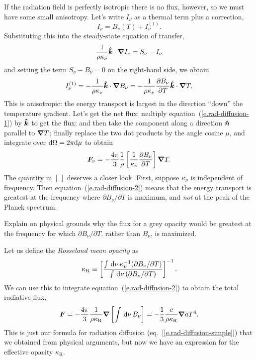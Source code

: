 If the radiation field is perfectly isotropic there is no flux, however, so we must have some small anisotropy. Let's write $I_{\nu}$ as a thermal term plus a correction, 
\[ I_{\nu} = B_{\nu}(T) + I^{(1)}_{\nu}. \]
Substituting this into the steady-state equation of transfer,
\[ \frac{1}{\rho\kappa_{\nu}}\bm{\hat{k}}\cdot\bm{\nabla} I_{\nu}  = S_{\nu} - I_{\nu}\]
and setting the term $S_{\nu}-B_{\nu}=0$ on the right-hand side, we obtain
\begin{equation}\label{e.rad-diffusion-1}
I_{\nu}^{(1)} = -\frac{1}{\rho\kappa_{\nu}} \bm{\hat{k}}\cdot\bm{\nabla} B_{\nu} = -\frac{1}{\rho\kappa_{\nu}} \frac{\partial B_{\nu}}{\partial T} \bm{\hat{k}}\cdot\bm{\nabla} T.
\end{equation}
This is anisotropic: the energy transport is largest in the direction ``down'' the temperature gradient. Let's get the net flux: multiply equation~(\ref{e.rad-diffusion-1}) by $\bm{\hat{k}}$ to get the flux; and then take the component along a direction $\bm{\hat{n}}$ parallel to $\bm{\nabla} T$; finally replace the two dot products by the angle cosine $\mu$, and integrate over $\mathrm{d} \Omega = 2\pi \mathrm{d}\mu$ to obtain
\begin{equation}\label{e.rad-diffusion-2}
\bm{F}_{\nu} = -\frac{4\pi}{3}\frac{1}{\rho}\left[\frac{1}{\kappa_{\nu}}\frac{\partial B_{\nu}}{\partial T}\right]\bm{\nabla} T.
\end{equation}
The quantity in $[\,]$ deserves a closer look. First, suppose $\kappa_{\nu}$ is independent of frequency. Then equation~(\ref{e.rad-diffusion-2}) means that the energy transport is greatest at the frequency where $\partial B_{\nu}/\partial T$ is maximum, and \emph{not} at the peak of the Planck spectrum. 

\begin{exercisebox}
Explain on physical grounds why the flux for a grey opacity would be greatest at the frequency for which $\partial B_{\nu}/\partial T$, rather than $B_{\nu}$, is maximized.
\end{exercisebox}

Let us define the \emph{Rosseland mean opacity} as
\[ \kappa_{\mathrm{R}} \equiv \left[\frac{\int\,\mathrm{d}\nu\,\kappa_{\nu}^{-1}(\partial B_{\nu}/\partial T)}{\int \,\mathrm{d}\nu\, (\partial B_{\nu}/\partial T)}\right]^{-1}. \]
We can use this to integrate equation~(\ref{e.rad-diffusion-2}) to obtain the total radiative flux,
\begin{equation}\label{e.rad-flux}
\bm{F} = - \frac{4\pi}{3} \frac{1}{\rho\kappa_{\mathrm{R}}} \bm{\nabla}\left[\int\,\mathrm{d}\nu\,B_{\nu}\right] = - \frac{1}{3} \frac{c}{\rho\kappa_{\mathrm{R}}} \bm{\nabla} aT^{4}.
\end{equation}
This is just our formula for radiation diffusion (eq.~[\ref{e.rad-diffusion-simple}]) that we obtained from physical arguments, but now we have an expression for the effective opacity $\kappa_{\mathrm{R}}$.

